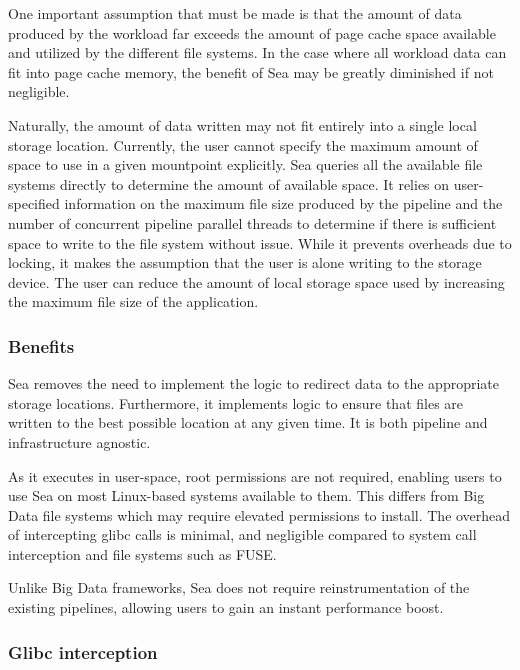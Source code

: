 \documentclass[10pt,journal,compsoc]{IEEEtran}
\newcommand{\todo}[1]{\marginpar{\parbox{18mm}{\flushleft\tiny\color{red}\textbf{TODO}:
#1}}}
\begin{document}
One important assumption that must be made is that the amount of data produced
by the workload far exceeds the amount of page cache space available and
utilized by the different file systems. In the case where all workload data can
fit into page cache memory, the benefit of Sea may be greatly diminished if not
negligible.

Naturally, the amount of data written may not fit entirely into a single local
storage location. Currently, the user cannot specify the maximum amount of space
to use in a given mountpoint explicitly. Sea queries all the available file
systems directly to determine the amount of available space. It relies on
user-specified information on the maximum file size produced by the pipeline and
the number of concurrent pipeline parallel threads to determine if there is
sufficient space to write to the file system without issue. While it prevents
overheads due to locking, it makes the assumption that the user is alone writing
to the storage device. The user can reduce the amount of local storage space
used by increasing the maximum file size of the application.



\subsubsection{Benefits}
Sea removes the need to implement the logic to redirect data to the appropriate
storage locations. Furthermore, it implements logic to ensure that files are
written to the best possible location at any given time. It is both pipeline and
infrastructure agnostic.

As it executes in user-space, root permissions are not required, enabling users
to use Sea on most Linux-based systems available to them. This differs from Big
Data file systems which may require elevated permissions to install. The
overhead of intercepting glibc calls is minimal, and negligible compared to
system call interception and file systems such as FUSE.

Unlike Big Data frameworks, Sea does not require reinstrumentation of the
existing pipelines, allowing users to gain an instant performance boost.

\subsubsection{Glibc interception}
\end{document}

